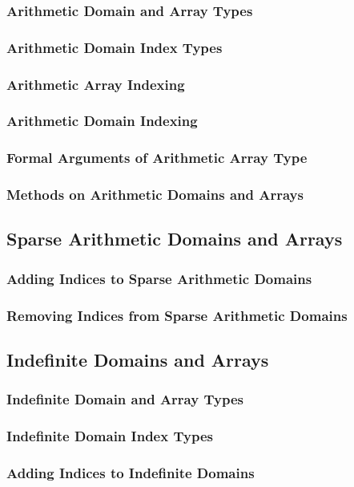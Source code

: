 \documentclass[10pt,twoside,titlepage]{article}
\begin{document}
\subsubsection{Arithmetic Domain and Array Types}
\subsubsection{Arithmetic Domain Index Types}
\subsubsection{Arithmetic Array Indexing}
\subsubsection{Arithmetic Domain Indexing}
\subsubsection{Formal Arguments of Arithmetic Array Type}
\subsubsection{Methods on Arithmetic Domains and Arrays}
\subsection{Sparse Arithmetic Domains and Arrays}
\subsubsection{Adding Indices to Sparse Arithmetic Domains}
\subsubsection{Removing Indices from Sparse Arithmetic Domains}
\subsection{Indefinite Domains and Arrays}
\subsubsection{Indefinite Domain and Array Types}
\subsubsection{Indefinite Domain Index Types}
\subsubsection{Adding Indices to Indefinite Domains}
\end{document}
